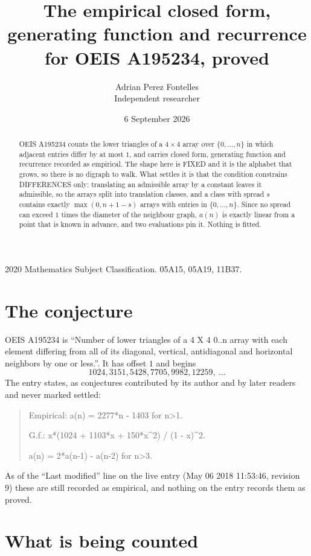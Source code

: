 \documentclass[11pt,a4paper]{article}
\title{The empirical closed form, generating function and recurrence for OEIS A195234, proved}
\author{Adrian Perez Fontelles\\ \small Independent researcher}
\date{6 September 2026}
\theoremstyle{plain}
\theoremstyle{definition}
\begin{document}
\maketitle

\begin{abstract}
OEIS A195234 counts the lower triangles of a $4\times4$ array over $\{0,\dots,n\}$ in which
adjacent entries differ by at most $1$, and carries closed form, generating function and recurrence recorded as empirical. The shape here is FIXED
and it is the alphabet that grows, so there is no digraph to walk. What settles it is that the
condition constrains DIFFERENCES only: translating an admissible array by a constant leaves it
admissible, so the arrays split into translation classes, and a class with spread $s$ contains
exactly $\max(0,n+1-s)$ arrays with entries in $\{0,\dots,n\}$. Since no spread can exceed
$1$ times the diameter of the neighbour graph, $a(n)$ is exactly linear from a point that is
known in advance, and two evaluations pin it. Nothing is fitted.
\end{abstract}

\noindent\small 2020 Mathematics Subject Classification. 05A15, 05A19, 11B37.\normalsize

\section{The conjecture}

OEIS A195234 is ``Number of lower triangles of a 4 X 4 0..n array with each element differing from all of its diagonal, vertical, antidiagonal and horizontal neighbors by one or less.''. It has offset $1$ and begins
\[
1024, 3151, 5428, 7705, 9982, 12259,\ \dots
\]
The entry states, as conjectures contributed by its author and by later readers and never
marked settled:
\begin{quote}
Empirical: a(n) = 2277*n - 1403 for n>1.

G.f.: x*(1024 + 1103*x + 150*x\^{}2) / (1 - x)\^{}2.

a(n) = 2*a(n-1) - a(n-2) for n>3.
\end{quote}
As of the ``Last modified'' line on the live entry (May 06 2018 11:53:46, revision 9) these are still
recorded as empirical, and nothing on the entry records them as proved.

\section{What is being counted}
\end{document}
